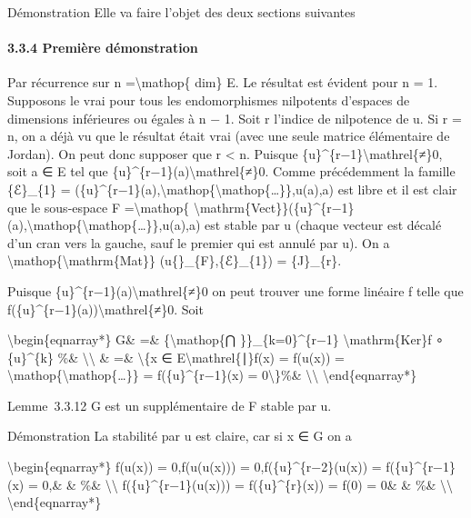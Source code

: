 \documentclass[]{article}
\begin{document}
Démonstration Elle va faire l'objet des deux sections suivantes

\paragraph{3.3.4 Première démonstration}

Par récurrence sur n =\textbackslash{}mathop\{ dim\} E. Le résultat est
évident pour n = 1. Supposons le vrai pour tous les endomorphismes
nilpotents d'espaces de dimensions inférieures ou égales à n − 1. Soit r
l'indice de nilpotence de u. Si r = n, on a déjà vu que le résultat
était vrai (avec une seule matrice élémentaire de Jordan). On peut donc
supposer que r \textless{} n. Puisque
\{u\}\^{}\{r−1\}\textbackslash{}mathrel\{≠\}0, soit a ∈ E tel que
\{u\}\^{}\{r−1\}(a)\textbackslash{}mathrel\{≠\}0. Comme précédemment la
famille \{ℰ\}\_\{1\} =
(\{u\}\^{}\{r−1\}(a),\textbackslash{}mathop\{\textbackslash{}mathop\{\ldots{}\}\},u(a),a)
est libre et il est clair que le sous-espace F =\textbackslash{}mathop\{
\textbackslash{}mathrm\{Vect\}\}(\{u\}\^{}\{r−1\}(a),\textbackslash{}mathop\{\textbackslash{}mathop\{\ldots{}\}\},u(a),a)
est stable par u (chaque vecteur est décalé d'un cran vers la gauche,
sauf le premier qui est annulé par u). On a
\textbackslash{}mathop\{\textbackslash{}mathrm\{Mat\}\}
(u\{\textbar{}\}\_\{F\},\{ℰ\}\_\{1\}) = \{J\}\_\{r\}.

Puisque \{u\}\^{}\{r−1\}(a)\textbackslash{}mathrel\{≠\}0 on peut trouver
une forme linéaire f telle que
f(\{u\}\^{}\{r−1\}(a))\textbackslash{}mathrel\{≠\}0. Soit

\textbackslash{}begin\{eqnarray*\} G\& =\& \{\textbackslash{}mathop\{⋂
\}\}\_\{k=0\}\^{}\{r−1\} \textbackslash{}mathrm\{Ker\}f ∘ \{u\}\^{}\{k\}
\%\& \textbackslash{}\textbackslash{} \& =\& \textbackslash{}\{x ∈
E\textbackslash{}mathrel\{∣\}f(x) = f(u(x)) =
\textbackslash{}mathop\{\textbackslash{}mathop\{\ldots{}\}\} =
f(\{u\}\^{}\{r−1\}(x) = 0\textbackslash{}\}\%\&
\textbackslash{}\textbackslash{} \textbackslash{}end\{eqnarray*\}

Lemme~3.3.12 G est un supplémentaire de F stable par u.

Démonstration La stabilité par u est claire, car si x ∈ G on a

\textbackslash{}begin\{eqnarray*\} f(u(x)) = 0,f(u(u(x))) =
0,f(\{u\}\^{}\{r−2\}(u(x)) = f(\{u\}\^{}\{r−1\}(x) = 0,\& \& \%\&
\textbackslash{}\textbackslash{} f(\{u\}\^{}\{r−1\}(u(x))) =
f(\{u\}\^{}\{r\}(x)) = f(0) = 0\& \& \%\&
\textbackslash{}\textbackslash{} \textbackslash{}end\{eqnarray*\}
\end{document}
